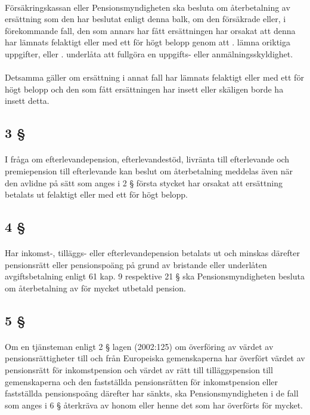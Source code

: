 \documentclass[a4paper,notitlepage,openany,10pt]{book}
\begin{document}
\paragraph*{}
Försäkringskassan eller Pensionsmyndigheten ska besluta om återbetalning av ersättning som den har beslutat enligt denna balk, om den försäkrade eller, i förekommande fall, den som annars har fått ersättningen har orsakat att denna har lämnats felaktigt eller med ett för högt belopp genom att
. lämna oriktiga uppgifter, eller
. underlåta att fullgöra en uppgifts- eller anmälningsskyldighet.
\paragraph*{}
Detsamma gäller om ersättning i annat fall har lämnats felaktigt eller med ett för högt belopp och den som fått ersättningen har insett eller skäligen borde ha insett detta.
\subsection*{3 §}
\paragraph*{}
I fråga om efterlevandepension, efterlevandestöd, livränta till efterlevande och premiepension till efterlevande kan beslut om återbetalning meddelas även när den avlidne på sätt som anges i 2 § första stycket har orsakat att ersättning betalats ut felaktigt eller med ett för högt belopp.
\subsection*{4 §}
\paragraph*{}
Har inkomst-, tilläggs- eller efterlevandepension betalats ut och minskas därefter pensionsrätt eller pensionspoäng på grund av bristande eller underlåten avgiftsbetalning enligt 61 kap. 9 respektive 21 § ska Pensionsmyndigheten besluta om återbetalning av för mycket utbetald pension.
\subsection*{5 §}
\paragraph*{}
Om en tjänsteman enligt 2 § lagen (2002:125) om överföring av värdet av pensionsrättigheter till och från Europeiska gemenskaperna har överfört värdet av pensionsrätt för inkomstpension och värdet av rätt till tilläggspension till gemenskaperna och den fastställda pensionsrätten för inkomstpension eller fastställda pensionspoäng därefter har sänkts, ska Pensionsmyndigheten i de fall som anges i 6 § återkräva av honom eller henne det som har överförts för mycket.
\end{document}

